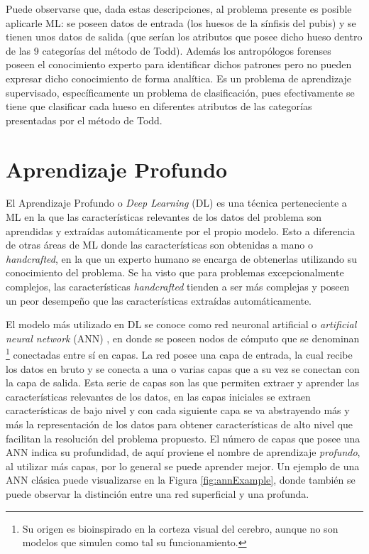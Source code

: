 Puede observarse que, dada estas descripciones, al problema presente es posible aplicarle ML: se poseen datos de entrada (los huesos de la sínfisis del pubis) y se tienen unos datos de salida (que serían los atributos que posee dicho hueso dentro de las 9 categorías del método de Todd). Además los antropólogos forenses poseen el conocimiento experto para identificar dichos patrones pero no pueden expresar dicho conocimiento de forma analítica. Es un problema de aprendizaje supervisado, específicamente un problema de clasificación, pues efectivamente se tiene que clasificar cada hueso en diferentes atributos de las categorías presentadas por el método de Todd.

\section{Aprendizaje Profundo}
\label{section:DL}
El Aprendizaje Profundo o \textit{Deep Learning} (DL) \cite{Goodfellow-et-al-2016, lecun_deep_2015, schmidhuber_deep_2015} es una técnica perteneciente a ML en la que las características relevantes de los datos del problema son aprendidas y extraídas automáticamente por el propio modelo. Esto a diferencia de otras áreas de ML donde las características son obtenidas a mano o \textit{handcrafted}, en la que un experto humano se encarga de obtenerlas utilizando su conocimiento del problema. Se ha visto que para problemas excepcionalmente complejos, las características \textit{handcrafted} tienden a ser más complejas y poseen un peor desempeño que las características extraídas automáticamente. 

El modelo más utilizado en DL se conoce como red neuronal artificial o \textit{artificial neural network} (ANN) \cite{bishop_ANN, ripley_ANN}, en donde se poseen nodos de cómputo que se denominan  \footnote{Su origen es bioinspirado en la corteza visual del cerebro, aunque no son modelos que simulen como tal su funcionamiento.} conectadas entre sí en capas. La red posee una capa de entrada, la cual recibe los datos en bruto y se conecta a una o varias capas  que a su vez se conectan con la capa de salida. Esta serie de capas son las que permiten extraer y aprender las características relevantes de los datos, en las capas iniciales se extraen características de bajo nivel y con cada siguiente capa se va abstrayendo más y más la representación de los datos para obtener características de alto nivel que facilitan la resolución del problema propuesto. El número de capas que posee una ANN indica su profundidad, de aquí proviene el nombre de aprendizaje \textit{profundo}, al utilizar más capas, por lo general se puede aprender mejor. Un ejemplo de una ANN clásica puede visualizarse en la Figura \ref{fig:annExample}, donde también se puede observar la distinción entre una red superficial y una profunda.

